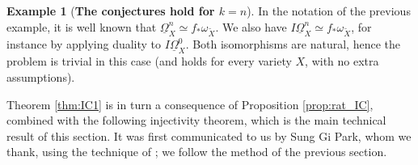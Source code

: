 \documentclass[11pt]{amsart}
\theoremstyle{definition}
\newtheorem{definition}[equation]{Definition}
\newtheorem{example}[equation]{Example}
\theoremstyle{plain}
\newcommand{\DB}{\underline{\Omega}} %
\begin{document}
\begin{example}[{\bf The conjectures hold for $k= n$}]
In the notation of the previous example, it is well known that $\DB^n_X \simeq f_* \omega_{\widetilde X}$. We also have $I\DB^n_X \simeq f_* \omega_{\widetilde X}$, for instance by applying duality to $I\DB^0_X$. Both isomorphisms 
are natural, hence the problem is trivial in this case (and holds for every variety $X$, with no extra assumptions).
\end{example}

\fi



Theorem \ref{thm:IC1} is in turn a consequence of Proposition \ref{prop:rat_IC}, combined with the following injectivity theorem, which is 
the main technical result of this section. It was first communicated to us by Sung Gi Park, whom we thank, using the technique of \cite[Lemma 3.7]{Park}; we follow the method of the previous section.

\end{document}
